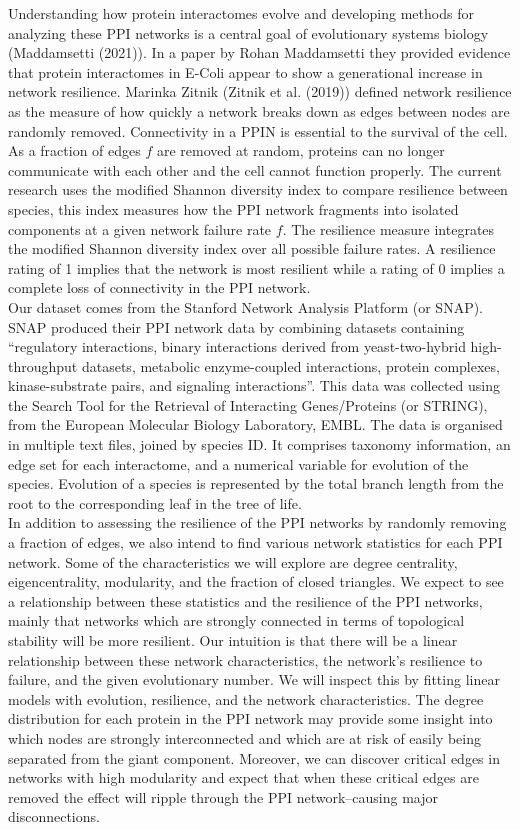 \documentclass[12pt]{article}
\begin{document}
\indent Understanding how protein interactomes evolve and developing methods for analyzing these PPI networks is a central goal of evolutionary systems biology (Maddamsetti (2021)). In a paper by Rohan Maddamsetti they provided evidence that protein interactomes in E-Coli appear to show a generational increase in network resilience. Marinka Zitnik (Zitnik et al. (2019)) defined network resilience as the measure of how quickly a network breaks down as edges between nodes are randomly removed. Connectivity in a PPIN is essential to the survival of the cell. As a fraction of edges $f$ are removed at random, proteins can no longer communicate with each other and the cell cannot function properly. The current research uses the modified Shannon diversity index to compare resilience between species, this index measures how the PPI network fragments into isolated components at a given network failure rate $f$. The resilience measure integrates the modified Shannon diversity index over all possible failure rates. A resilience rating of 1 implies that the network is most resilient while a rating of 0 implies a complete loss of connectivity in the PPI network. \\
\indent Our dataset comes from the Stanford Network Analysis Platform (or SNAP). SNAP produced their PPI network data by combining datasets containing “regulatory interactions, binary interactions derived from yeast-two-hybrid high-throughput datasets, metabolic enzyme-coupled interactions, protein complexes, kinase-substrate pairs, and signaling interactions”. This data was collected using the Search Tool for the Retrieval of Interacting Genes/Proteins (or STRING), from the European Molecular Biology Laboratory, EMBL. The data is organised in multiple text files, joined by species ID. It comprises taxonomy information, an edge set for each interactome, and a numerical variable for evolution of the species. Evolution of a species is represented by the total branch length from the root to the corresponding leaf in the tree of life. \\
\indent In addition to assessing the resilience of the PPI networks by randomly removing a fraction of edges, we also intend to find various network statistics for each PPI network. Some of the characteristics we will explore are degree centrality, eigencentrality, modularity, and the fraction of closed triangles. We expect to see a relationship between these statistics and the resilience of the PPI networks, mainly that networks which are strongly connected in terms of topological stability will be more resilient. Our intuition is that there will be a linear relationship between these network characteristics, the network's resilience to failure, and the given evolutionary number. We will inspect this by fitting linear models with evolution, resilience, and the network characteristics. The degree distribution for each protein in the PPI network may provide some insight into which nodes are strongly interconnected and which are at risk of easily being separated from the giant component. Moreover, we can discover critical edges in networks with high modularity and expect that when these critical edges are removed the effect will ripple through the PPI network--causing major disconnections. \\
\end{document}
